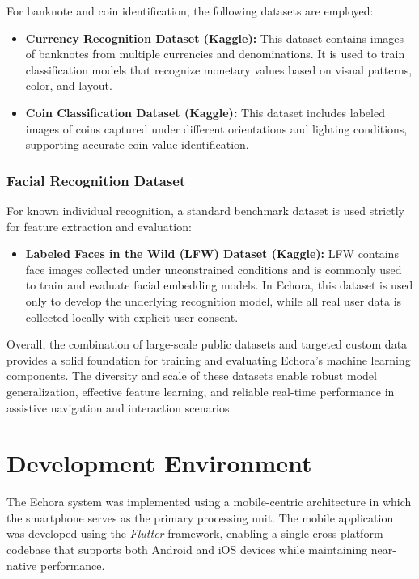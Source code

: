 For banknote and coin identification, the following datasets are employed:

\begin{itemize}
    \item \textbf{Currency Recognition Dataset (Kaggle):}  
    This dataset contains images of banknotes from multiple currencies and denominations.
    It is used to train classification models that recognize monetary values based on visual
    patterns, color, and layout.

    \item \textbf{Coin Classification Dataset (Kaggle):}  
    This dataset includes labeled images of coins captured under different orientations and
    lighting conditions, supporting accurate coin value identification.
\end{itemize}

\subsubsection{Facial Recognition Dataset}

For known individual recognition, a standard benchmark dataset is used strictly for feature
extraction and evaluation:

\begin{itemize}
    \item \textbf{Labeled Faces in the Wild (LFW) Dataset (Kaggle):}  
    LFW contains face images collected under unconstrained conditions and is commonly
    used to train and evaluate facial embedding models. In Echora, this dataset is used only
    to develop the underlying recognition model, while all real user data is collected locally
    with explicit user consent.
\end{itemize}



Overall, the combination of large-scale public datasets and targeted custom data provides a
solid foundation for training and evaluating Echora’s machine learning components. The
diversity and scale of these datasets enable robust model generalization, effective feature
learning, and reliable real-time performance in assistive navigation and interaction scenarios.




\section{Development Environment}

The Echora system was implemented using a mobile-centric architecture in which the smartphone serves as the primary processing unit. The mobile application was developed using the \textit{Flutter} framework, enabling a single cross-platform codebase that supports both Android and iOS devices while maintaining near-native performance.

